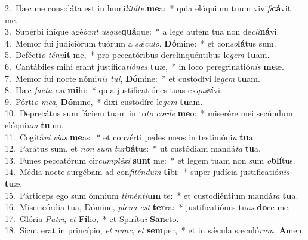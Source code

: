 {2.~}Hæc me consoláta est in humi\textit{li}\textit{tá}\textit{te} \textbf{me}a:~* quia elóquium tuum vivi\textit{fi}\textbf{cá}vit me.\\
{3.~}Supérbi iníque agé\textit{bant} \textit{us}\textit{que}\textbf{quá}que:~* a lege autem tua non de\textit{cli}\textbf{ná}vi.\\
{4.~}Memor fui judiciórum tuórum a \textit{sǽ}\textit{cu}\textit{lo}, \textbf{Dó}mine:~* et con\textit{so}\textbf{lá}tus sum.\\
{5.~}Defécti\textit{o} \textit{té}\textit{nu}\textbf{it} me,~* pro peccatóribus derelinquéntibus le\textit{gem} \textbf{tu}am.\\
{6.~}Cantábiles mihi erant justifica\textit{ti}\textit{ó}\textit{nes} \textbf{tu}æ,~* in loco peregrinatió\textit{nis} \textbf{me}æ.\\
{7.~}Memor fui nocte nómi\textit{nis} \textit{tu}\textit{i}, \textbf{Dó}mine:~* et custodívi le\textit{gem} \textbf{tu}am.\\
{8.~}Hæc \textit{fa}\textit{cta} \textit{est} \textbf{mi}hi:~* quia justificatiónes tuas ex\textit{qui}\textbf{sí}vi.\\
{9.~}Pórti\textit{o} \textit{me}\textit{a}, \textbf{Dó}mine,~* dixi custodíre le\textit{gem} \textbf{tu}am.\\
{10.~}Deprecátus sum fáciem tuam in to\textit{to} \textit{cor}\textit{de} \textbf{me}o:~* miserére mei secúndum elóqui\textit{um} \textbf{tu}um.\\
{11.~}Cogitá\textit{vi} \textit{vi}\textit{as} \textbf{me}as:~* et convérti pedes meos in testimóni\textit{a} \textbf{tu}a.\\
{12.~}Parátus sum, et \textit{non} \textit{sum} \textit{tur}\textbf{bá}tus:~* ut custódiam mandá\textit{ta} \textbf{tu}a.\\
{13.~}Funes peccatórum cir\textit{cum}\textit{plé}\textit{xi} \textbf{sunt} me:~* et legem tuam non sum \textit{o}\textbf{blí}tus.\\
{14.~}Média nocte surgébam ad con\textit{fi}\textit{tén}\textit{dum} \textbf{ti}bi:~* super judícia justificatió\textit{nis} \textbf{tu}æ.\\
{15.~}Párticeps ego sum ómnium \textit{ti}\textit{mén}\textit{ti}\textbf{um} te:~* et custodiéntium mandá\textit{ta} \textbf{tu}a.\\
{16.~}Misericórdia tua, Dómine, \textit{ple}\textit{na} \textit{est} \textbf{ter}ra:~* justificatiónes tu\textit{as} \textbf{do}ce me.\\
{17.~}Glória \textit{Pa}\textit{tri}, \textit{et} \textbf{Fí}lio,~* et Spirítu\textit{i} \textbf{San}cto.\\
{18.~}Sicut erat in princípio, \textit{et} \textit{nunc}, \textit{et} \textbf{sem}per,~* et in sǽcula sæculó\textit{rum}. \textbf{A}men.\\
